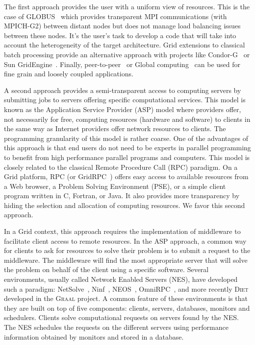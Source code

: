 \documentclass[12pt,a4paper]{book}
\newcommand{\diet}{\textsc{Diet}\xspace}
\begin{document}
The first approach provides the user with a uniform view of
resources. This is the case of GLOBUS~\cite{Globus} which provides
transparent MPI communications (with MPICH-G2) between distant nodes
but does not manage load balancing issues between these nodes. It's
the user's task to develop a code that will take into account the
heterogeneity of the target architecture. Grid extensions to
classical batch processing provide an alternative approach with
projects like Condor-G~\cite{Condor} or Sun
GridEngine~\cite{SunGridEngine}. Finally, peer-to-peer~\cite{Oram01}
or Global computing~\cite{germain01global} can be used for fine
grain and loosely coupled applications.

A second approach provides a semi-transparent access to computing
servers by submitting jobs to servers offering specific
computational services. This model is known
as the Application Service Provider (ASP) model where providers offer,
not necessarily for free, computing resources (hardware and software)
to clients in the same way as Internet providers offer network
resources to clients. The programming granularity of this model is
rather coarse. One of the advantages of this approach is that end
users do not need to be experts in parallel programming to benefit
from high performance parallel programs and computers. This model is
closely related to the classical Remote Procedure Call (RPC)
paradigm. On a Grid platform, RPC (or
GridRPC~\cite{MNS+00,NMSDLC02}) offers easy access to available
resources from a Web browser, a Problem Solving Environment (PSE), or a
simple client program written in C, Fortran, or Java.  It also
provides more transparency by hiding the selection and allocation of
computing resources. We favor this second approach.

In a Grid context, this approach requires the implementation of
middleware to facilitate client access to remote resources. In the ASP
approach, a common way for clients to ask for resources to solve their
problem is to submit a request to the middleware. The middleware will
find the most appropriate server that will solve the problem on behalf
of the client using a specific software. Several environments, usually
called Network Enabled Servers (NES), have developed such a paradigm:
NetSolve~\cite{nug}, Ninf~\cite{NSS99}, NEOS~\cite{FMM00},
OmniRPC~\cite{SHTS01}, and more recently \diet developed in the
\textsc{Graal} project. A common feature of these environments is that
they are built on top of five components: clients, servers, databases,
monitors and schedulers. Clients solve computational requests on
servers found by the NES. The NES schedules the requests on the
different servers using performance information obtained by monitors
and stored in a database.
\end{document}
